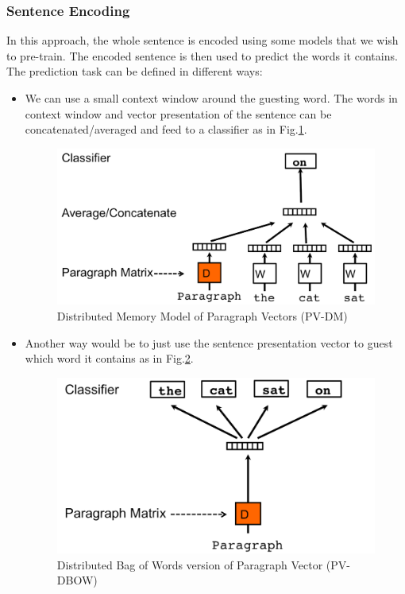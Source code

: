 \subsubsection{Sentence Encoding}
In this approach, the whole sentence is encoded using some models that we wish to pre-train. 
The encoded sentence is then used to predict the words it contains.  
The prediction task can be defined in different ways:
\begin{itemize}
\item We can use a small context window around the guesting word.
The words in context window and vector presentation of the sentence can be concatenated/averaged and feed to a classifier as in Fig.\ref{fig:para-vec-1}.

\begin{figure}[H]
    \centering    \includegraphics[scale=0.3]{figure/para-vec-1}
    \caption{Distributed Memory Model of Paragraph Vectors (PV-DM)~\cite{ParagraphVec}}
    \label{fig:para-vec-1}
\end{figure}

\item Another way would be to just use the sentence presentation vector to guest which word it contains as in Fig.\ref{fig:para-vec-2}.

\begin{figure}[H]
    \centering    \includegraphics[scale=0.3]{figure/para-vec-2}
    \caption{Distributed Bag of Words version of Paragraph Vector (PV-DBOW)~\cite{ParagraphVec}}
    \label{fig:para-vec-2}
\end{figure}


\end{itemize}
